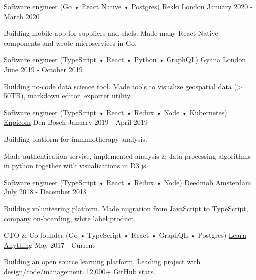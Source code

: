 
\begin{cventries}

  \cventry
    {Software engineer (Go • React Native • Postgres)}
    {\href{https://www.rekki.com}{Rekki}}
    {London}
    {January 2020 - March 2020}
     {
      \begin{cvitems}
        \item {Building mobile app for suppliers and chefs. Made many React Native components and wrote microservices in Go.}
      \end{cvitems}
    }

  \cventry
    {Software engineer (TypeScript • React • Python • GraphQL)}
    {\href{https://www.gyana.co.uk}{Gyana}}
    {London}
    {June 2019 - October 2019}
     {
      \begin{cvitems}
        \item {Building no-code data science tool. Made tools to visualize geospatial data (> 50TB), markdown editor, exporter utility.}
      \end{cvitems}
    }

  \cventry
    {Software engineer (TypeScript • React • Redux • Node • Kubernetes)}
    {\href{https://www.enpicom.com}{Enpicom}}
    {Den Bosch}
    {January 2019 - April 2019}
     {
      \begin{cvitems}
        \item {Building platform for immunotherapy analysis.}
        \item {Made authentication service, implemented analysis \& data processing algorithms in python together with visualizations in D3.js.}
      \end{cvitems}
    }

  \cventry
    {Software engineer (TypeScript  • React • Redux • Node)}
    {\href{https://www.deedmob.com}{Deedmob}}
    {Amsterdam}
    {July 2018 - December 2018}
     {
      \begin{cvitems}
        \item {Building volunteering platform. Made migration from JavaScript to TypeScript, company on-boarding, white label product.}
      \end{cvitems}
    }

  \cventry
    {CTO \& Co-founder (Go • TypeScript • React • GraphQL • Postgres)}
    {\href{https://learn-anything.xyz}{Learn Anything}}
    {}
    {May 2017 - Current}
     {
      \begin{cvitems}
        \item {Building an open source learning platform. Leading project with design/code/management. 12,000+ \href{https://github.com/learn-anything/learn-anything}{GitHub} stars.}
      \end{cvitems}
    }

\end{cventries}
